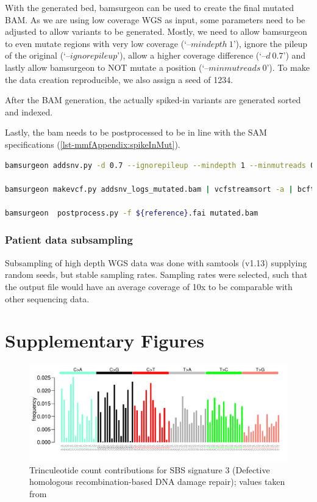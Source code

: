 With the generated bed, bamsurgeon can be used to create the final mutated BAM. As we are using low coverage WGS as input, some parameters need to be adjusted to allow variants to be generated. Mostly, we need to allow bamsurgeon to even mutate regions with very low coverage (\lq--$mindepth~1$\rq), ignore the pileup of the original (\lq--$ignorepileup$\rq), allow a higher coverage difference (\lq--$d~0.7$\rq) and lastly allow bamsurgeon to NOT mutate a position (\lq--$minmutreads~0$\rq). To make the data creation reproducible, we also assign a seed of 1234.

After the BAM generation, the actually spiked-in variants are generated sorted and indexed.

Lastly, the bam needs to be postprocessed to be in line with the SAM specifications (\autoref{lst-mmfAppendix:spikeInMut}).

\begin{lstlisting}[language=bash, caption=bamsurgeon spike-in, label={lst-mmfAppendix:spikeInMut}]
bamsurgeon addsnv.py -d 0.7 --ignorepileup --mindepth 1 --minmutreads 0 -v mutations.bed -r $reference -o mutated.bam --aligner mem --seed 1234 -f input.bam

bamsurgeon makevcf.py addsnv_logs_mutated.bam | vcfstreamsort -a | bcftools view -o variants.vcf.gz -O z && bcftools index -t variants.vcf.gz

bamsurgeon  postprocess.py -f ${reference}.fai mutated.bam
\end{lstlisting}


\subsection{Patient data subsampling}
\label{ch-mmfAppendix:subsampling}
Subsampling of high depth WGS data was done with samtools (v1.13) supplying random seeds, but stable sampling rates. Sampling rates were selected, such that the output file would have an average coverage of 10x to be comparable with other sequencing data.


\chapter*{Supplementary Figures}

\begin{figure}[!ht]
\centering
\includegraphics[width=.99\linewidth]{Figures/SBS3Signature.pdf}
\caption[Trinculeotide count contributions for single base substitution (SBS) signature 3]{Trinculeotide count contributions for SBS signature 3 (Defective homologous recombination-based DNA damage repair); values taken from \protect\textcite{Alexandrov2020}}\label{A:fig:sig3}
\end{figure}

